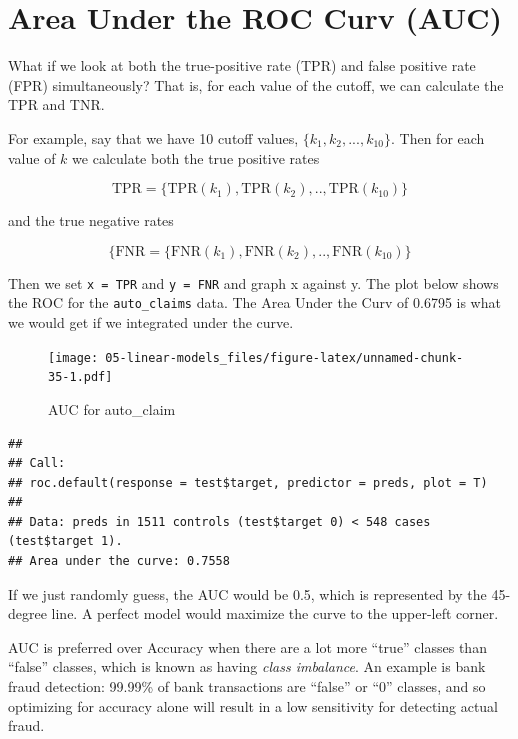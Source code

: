 \documentclass[
  openany]{book}
\newenvironment{Shaded}{\begin{snugshade}}{\end{snugshade}}
\newcommand{\DataTypeTok}[1]{\textcolor[rgb]{0.13,0.29,0.53}{#1}}
\newcommand{\KeywordTok}[1]{\textcolor[rgb]{0.13,0.29,0.53}{\textbf{#1}}}
\newcommand{\NormalTok}[1]{#1}
\newcommand{\OperatorTok}[1]{\textcolor[rgb]{0.81,0.36,0.00}{\textbf{#1}}}
\begin{document}
\hypertarget{area-under-the-roc-curv-auc}{%
\section{Area Under the ROC Curv (AUC)}\label{area-under-the-roc-curv-auc}}

What if we look at both the true-positive rate (TPR) and false positive rate (FPR) simultaneously? That is, for each value of the cutoff, we can calculate the TPR and TNR.

For example, say that we have 10 cutoff values, \(\{k_1, k_2, ..., k_{10}\}\). Then for each value of \(k\) we calculate both the true positive rates

\[\text{TPR} = \{\text{TPR}(k_1), \text{TPR}(k_2), .., \text{TPR}(k_{10})\} \]

and the true negative rates

\[\{\text{FNR} = \{\text{FNR}(k_1), \text{FNR}(k_2), .., \text{FNR}(k_{10})\}\]

Then we set \texttt{x\ =\ TPR} and \texttt{y\ =\ FNR} and graph x against y. The plot below shows the ROC for the \texttt{auto\_claims} data. The Area Under the Curv of 0.6795 is what we would get if we integrated under the curve.

\begin{Shaded}
\end{Shaded}

\begin{figure}
\centering
\texttt{[image: 05-linear-models\_files/figure-latex/unnamed-chunk-35-1.pdf]}
\caption{\label{fig:unnamed-chunk-35}AUC for auto\_claim}
\end{figure}

\begin{verbatim}
## 
## Call:
## roc.default(response = test$target, predictor = preds, plot = T)
## 
## Data: preds in 1511 controls (test$target 0) < 548 cases (test$target 1).
## Area under the curve: 0.7558
\end{verbatim}

If we just randomly guess, the AUC would be 0.5, which is represented by the 45-degree line. A perfect model would maximize the curve to the upper-left corner.

AUC is preferred over Accuracy when there are a lot more ``true'' classes than ``false'' classes, which is known as having \emph{class imbalance}. An example is bank fraud detection: 99.99\% of bank transactions are ``false'' or ``0'' classes, and so optimizing for accuracy alone will result in a low sensitivity for detecting actual fraud.
\end{document}
